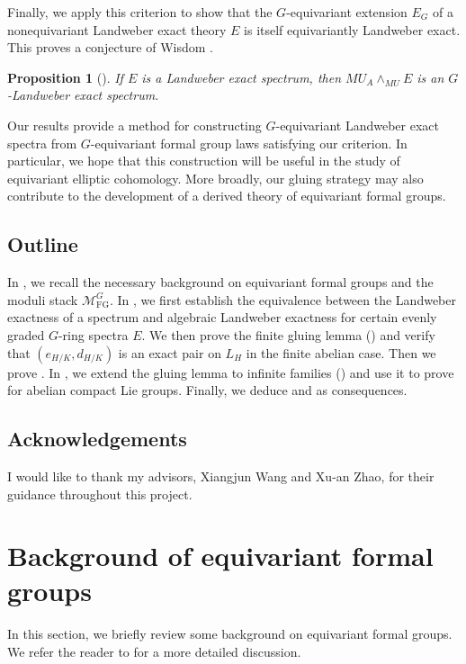 \documentclass[11pt,reqno]{amsart}
\newtheorem{proposition}[proposition]{Proposition}
\newcommand{\MFG}{\mathcal M_{\mathrm{FG}}}
\begin{document}
Finally, we apply this criterion to show that the $G$-equivariant extension $E_G$ of a nonequivariant Landweber exact theory $E$ is itself equivariantly Landweber exact. This proves a conjecture of Wisdom \cite[Conjecture 2.18]{wisdom2024properties}.
\begin{proposition}[]\label{introprop:conjecture-in-Wisdom}
  If $E$ is a Landweber exact spectrum, then $MU_A \wedge_{MU} E$ is an $G$-Landweber exact spectrum.
\end{proposition}

Our results provide a method for constructing $G$-equivariant Landweber exact spectra from $G$-equivariant formal group laws satisfying our criterion. In particular, we hope that this construction will be useful in the study of equivariant elliptic cohomology. More broadly, our gluing strategy may also contribute to the development of a derived theory of equivariant formal groups.


    \subsection{Outline}
    In , we recall the necessary background on equivariant formal groups and the moduli stack $\MFG^G$. In , we first establish the equivalence between the Landweber exactness of a spectrum and algebraic Landweber exactness for certain evenly graded $G$-ring spectra $E$. We then prove the finite gluing lemma () and verify that $(e_{H/K},d_{H/K})$ is an exact pair on $L_H$ in the finite abelian case. Then we prove . In , we extend the gluing lemma to infinite families () and use it to prove  for abelian compact Lie groups. Finally, we deduce  and  as consequences.
    

    \subsection*{Acknowledgements}
    I would like to thank my advisors, Xiangjun Wang and Xu-an Zhao, for their guidance throughout this project.

\section{Background of equivariant formal groups}\label{sec:background}
In this section, we briefly review some background on equivariant formal groups. We refer the reader to \cite{strickland2011multicurves,hausmann2023invariant} for a more detailed discussion. 
\end{document}
